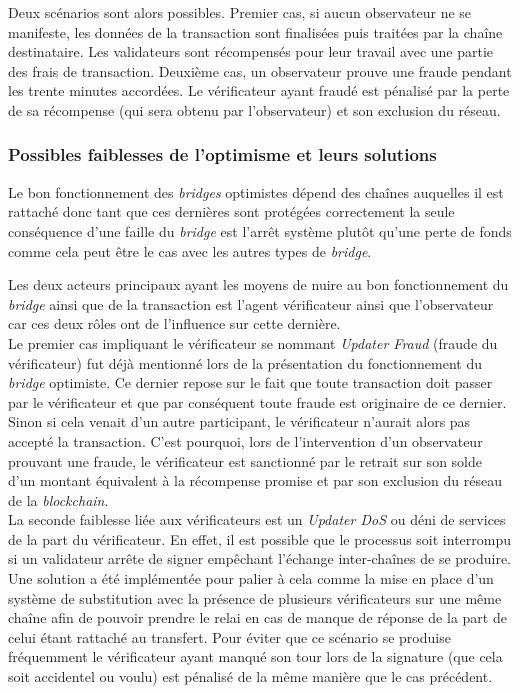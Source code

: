 Deux scénarios sont alors possibles. Premier cas, si aucun observateur ne se manifeste, les données de la transaction sont finalisées puis traitées par la chaîne destinataire. Les validateurs sont récompensés pour leur travail avec une partie des frais de transaction. \cite{Fees} Deuxième cas, un observateur prouve une fraude pendant les trente minutes accordées. Le \gls{vérificateur} ayant fraudé est pénalisé par la perte de sa récompense (qui sera obtenu par l'observateur) et son exclusion du réseau.\cite{EthereumSlashing}

\subsubsection{Possibles faiblesses de l’optimisme et leurs solutions}

Le bon fonctionnement des \textit{bridges} optimistes dépend des chaînes auquelles il est rattaché donc tant que ces dernières sont protégées correctement la seule conséquence d’une faille du \textit{bridge} est l’arrêt système plutôt qu’une perte de fonds comme cela peut être le cas avec les autres types de \textit{bridge}.

Les deux acteurs principaux ayant les moyens de nuire au bon fonctionnement du \textit{bridge} ainsi que de la transaction est l’agent \gls{vérificateur} ainsi que l’observateur car ces deux rôles ont de l’influence sur cette dernière. \\

Le premier cas impliquant le \gls{vérificateur} se nommant \textit{Updater Fraud} (fraude du \gls{vérificateur})  fut déjà mentionné lors de la présentation du fonctionnement du \textit{bridge} optimiste. Ce dernier repose sur le fait que toute transaction doit passer par le \gls{vérificateur} et que par conséquent toute fraude est originaire de ce dernier. Sinon si cela venait d’un autre participant, le \gls{vérificateur} n’aurait alors pas accepté la transaction. C’est pourquoi, lors de l’intervention d’un observateur prouvant une fraude, le \gls{vérificateur} est sanctionné par le retrait sur son solde d'un montant équivalent à la récompense promise et par son exclusion du réseau de la \textit{blockchain}. \\

La seconde faiblesse liée aux \gls{vérificateur}s est un \textit{Updater DoS} ou déni de services de la part du \gls{vérificateur}. En effet, il est possible que le processus soit interrompu si un validateur arrête de signer empêchant l'échange inter-chaînes de se produire.
Une solution a été implémentée pour palier à cela comme la mise en place d’un système de substitution avec la présence de plusieurs \gls{vérificateur}s sur une même chaîne afin de pouvoir prendre le relai en cas de manque de réponse de la part de celui étant rattaché au transfert.  Pour éviter que ce scénario se produise fréquemment le \gls{vérificateur} ayant manqué son tour lors de la signature (que cela soit accidentel ou voulu) est pénalisé de la même manière que le cas précédent. \\

